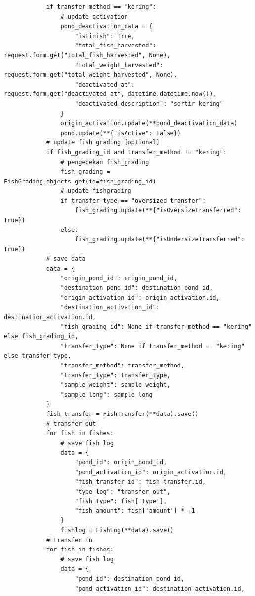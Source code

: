 \begin{enumerate}[1.]
\begin{lstlisting}
            if transfer_method == "kering":
                # update activation
                pond_deactivation_data = {
                    "isFinish": True,
                    "total_fish_harvested": request.form.get("total_fish_harvested", None),
                    "total_weight_harvested": request.form.get("total_weight_harvested", None),
                    "deactivated_at": request.form.get("deactivated_at", datetime.datetime.now()),
                    "deactivated_description": "sortir kering"
                }
                origin_activation.update(**pond_deactivation_data)
                pond.update(**{"isActive": False})
            # update fish grading [optional]
            if fish_grading_id and transfer_method != "kering":
                # pengecekan fish_grading
                fish_grading = FishGrading.objects.get(id=fish_grading_id)
                # update fishgrading
                if transfer_type == "oversized_transfer":
                    fish_grading.update(**{"isOversizeTransferred": True})
                else:
                    fish_grading.update(**{"isUndersizeTransferred": True})
            # save data
            data = {
                "origin_pond_id": origin_pond_id,
                "destination_pond_id": destination_pond_id,
                "origin_activation_id": origin_activation.id,
                "destination_activation_id": destination_activation.id,
                "fish_grading_id": None if transfer_method == "kering" else fish_grading_id,
                "transfer_type": None if transfer_method == "kering" else transfer_type,
                "transfer_method": transfer_method,
                "transfer_type": transfer_type,
                "sample_weight": sample_weight,
                "sample_long": sample_long
            }
            fish_transfer = FishTransfer(**data).save()
            # transfer out
            for fish in fishes:
                # save fish log
                data = {
                    "pond_id": origin_pond_id,
                    "pond_activation_id": origin_activation.id,
                    "fish_transfer_id": fish_transfer.id,
                    "type_log": "transfer_out",
                    "fish_type": fish['type'],
                    "fish_amount": fish['amount'] * -1
                }
                fishlog = FishLog(**data).save()
            # transfer in
            for fish in fishes:
                # save fish log
                data = {
                    "pond_id": destination_pond_id,
                    "pond_activation_id": destination_activation.id,

\end{lstlisting}
\end{enumerate}

